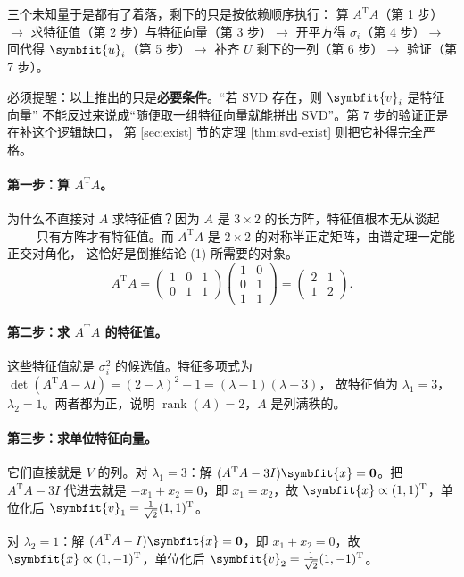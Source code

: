 \documentclass[UTF8, 11pt, a4paper, fontset=windows]{ctexart}
\theoremstyle{cnthm}
\theoremstyle{cndef}
\newcommand{\T}{^{\mathrm{T}}}
\DeclareMathOperator{\rank}{rank}
\newcommand{\bu}{\symbfit{u}}
\newcommand{\x}{\symbfit{x}}
\newcommand{\vv}{\symbfit{v}}
\begin{document}
三个未知量于是都有了着落，剩下的只是按依赖顺序执行：
算 $A\T A$（第 1 步）$\to$ 求特征值（第 2 步）与特征向量（第 3 步）$\to$
开平方得 $\sigma_i$（第 4 步）$\to$ 回代得 $\bu_i$（第 5 步）$\to$
补齐 $U$ 剩下的一列（第 6 步）$\to$ 验证（第 7 步）。

必须提醒：以上推出的只是\textbf{必要条件}。“若 SVD 存在，则 $\vv_i$ 是特征向量”
不能反过来说成“随便取一组特征向量就能拼出 SVD”。第 7 步的验证正是在补这个逻辑缺口，
第 \ref{sec:exist} 节的定理 \ref{thm:svd-exist} 则把它补得完全严格。

\paragraph{第一步：算 $A\T A$。}
为什么不直接对 $A$ 求特征值？因为 $A$ 是 $3\times2$ 的长方阵，特征值根本无从谈起——
只有方阵才有特征值。而 $A\T A$ 是 $2\times2$ 的对称半正定矩阵，由谱定理一定能正交对角化，
这恰好是倒推结论 (1) 所需要的对象。
\begin{equation}
  A\T A=
  \begin{pmatrix}1&0&1\\0&1&1\end{pmatrix}
  \begin{pmatrix}1&0\\0&1\\1&1\end{pmatrix}
  =\begin{pmatrix}2&1\\1&2\end{pmatrix}.
\end{equation}

\paragraph{第二步：求 $A\T A$ 的特征值。}
这些特征值就是 $\sigma_i^2$ 的候选值。特征多项式为
$\det(A\T A-\lambda I)=(2-\lambda)^2-1=(\lambda-1)(\lambda-3)$，
故特征值为 $\lambda_1=3$，$\lambda_2=1$。两者都为正，说明 $\rank(A)=2$，$A$ 是列满秩的。

\paragraph{第三步：求单位特征向量。}
它们直接就是 $V$ 的列。对 $\lambda_1=3$：解 $(A\T A-3I)\x=\mathbf{0}$。把 $A\T A-3I$ 代进去就是
$-x_1+x_2=0$，即 $x_1=x_2$，故 $\x\propto(1,1)\T$，单位化后
$\vv_1=\frac{1}{\sqrt2}(1,1)\T$。

对 $\lambda_2=1$：解 $(A\T A-I)\x=\mathbf{0}$，即 $x_1+x_2=0$，故
$\x\propto(1,-1)\T$，单位化后 $\vv_2=\frac{1}{\sqrt2}(1,-1)\T$。
\end{document}

